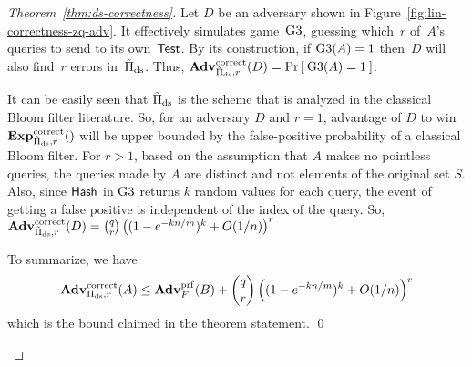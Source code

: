 \begin{proof}[Theorem~\ref{thm:ds-correctness}]
Let $D$ be an adversary shown in Figure~\ref{fig:lin-correctness-zq-adv}. It effectively simulates game~$\text{G3}$, guessing which~$r$ of~$A$'s queries to send to its own~$\mathsf{Test}$. By its construction, if $\text{G3}(A)=1$ then~$D$ will also find~$r$ errors in~$\tilde{\Pi}_{\mathrm{ds}}$.  Thus, $\mathrm{\mathbf{Adv}}^{\mathrm{correct}}_{\tilde{\Pi}_{\mathrm{ds}},r}(D) = \Pr\left[\: \text{G3}(A) = 1 \:\right]$.

It can be easily seen that  $\tilde{\Pi}_{\mathrm{ds}}$ is the scheme that is analyzed in the classical Bloom filter literature. So, for an adversary $D$ and $r=1$, advantage of $D$ to win $\ExpCorrect{\tilde{\setprim}_{\mathrm{ds}},r}$ will be upper bounded by the false-positive probability of a classical Bloom filter. For $r > 1$, based on the assumption that $A$ makes no pointless queries, the queries made by $A$ are distinct and not elements of the original set $S$. Also, since $\mathsf{Hash}$ in $\text{G3}$ returns $k$ random values for each query, the event of getting a false positive is independent of the index of the query. So, $\mathrm{\mathbf{Adv}}^{\mathrm{correct}}_{\tilde{\Pi}_{\mathrm{ds}},r}(D) =   {\binom{q}{r}} \left( (1-e^{-kn/m})^k + O(1/n) \right)^r$

\noindent
To summarize, we have
\[
\mathrm{\mathbf{Adv}}^{\mathrm{correct}}_{\Pi_{\mathrm{ds}},r}(A) \leq  \mathbf{Adv}^{\mathrm{prf}}_{F}(B)  + {\dbinom{q}{r}} \left( (1-e^{-kn/m})^k + O(1/n) \right)^r
\]
which is the bound claimed in the theorem statement. \hfill \qed

\begin{figure}[tp]
\end{figure}
\end{proof}

